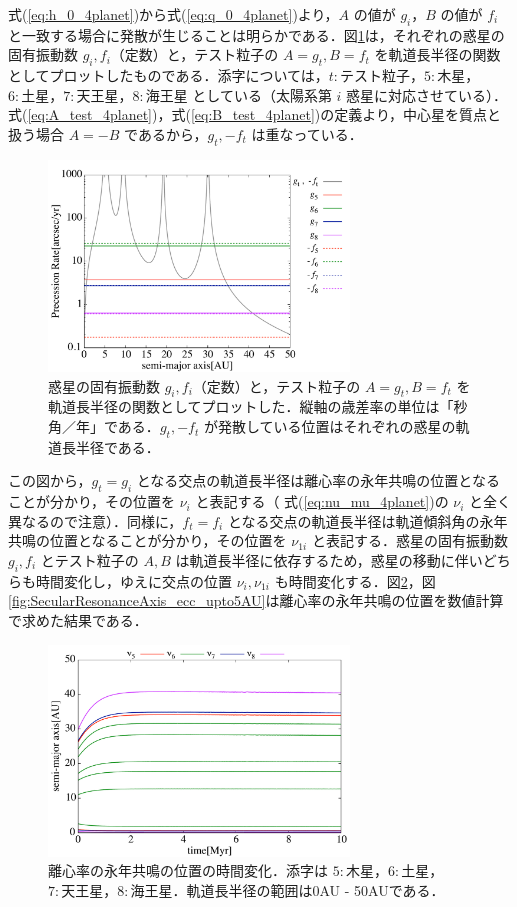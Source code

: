 \documentclass[11pt,a4paper,oneside,onecolumn]{jreport}
\begin{document}
式(\ref{eq:h_0_4planet})から式(\ref{eq:q_0_4planet})より，$A$ の値が $g_i$，$B$ の値が $f_i$ と一致する場合に発散が生じることは明らかである．図\ref{fig:PrecessionRate}は，それぞれの惑星の固有振動数 $g_i, f_i$（定数）と，テスト粒子の $A = g_t, B = f_t$ を軌道長半径の関数としてプロットしたものである．添字については，$t : テスト粒子$，$5 : 木星$，$6 : 土星$，$7 : 天王星$，$8 : 海王星$ としている（太陽系第 $i$ 惑星に対応させている）．式(\ref{eq:A_test_4planet})，式(\ref{eq:B_test_4planet})の定義より，中心星を質点と扱う場合 $A = - B$ であるから，$g_t, - f_t$ は重なっている．
\begin{figure}[H]
\centering
\includegraphics[width=8cm]{./image/PrecessionRate_logAB.pdf}
\caption{惑星の固有振動数 $g_i, f_i$（定数）と，テスト粒子の $A = g_t, B = f_t$ を軌道長半径の関数としてプロットした．縦軸の歳差率の単位は「秒角／年」である．$g_t, - f_t$ が発散している位置はそれぞれの惑星の軌道長半径である．\label{fig:PrecessionRate}}
\end{figure}
この図から，$g_t = g_i$ となる交点の軌道長半径は離心率の永年共鳴の位置となることが分かり，その位置を $\nu_i$ と表記する（ 式(\ref{eq:nu_mu_4planet})の $\nu_i$ と全く異なるので注意）．同様に，$f_t = f_i$ となる交点の軌道長半径は軌道傾斜角の永年共鳴の位置となることが分かり，その位置を $\nu_{1i}$ と表記する．惑星の固有振動数 $g_i, f_i$ とテスト粒子の $A, B$ は軌道長半径に依存するため，惑星の移動に伴いどちらも時間変化し，ゆえに交点の位置 $\nu_i, \nu_{1i}$ も時間変化する．図\ref{fig:SecularResonanceAxis_ecc}，図\ref{fig:SecularResonanceAxis_ecc_upto5AU}は離心率の永年共鳴の位置を数値計算で求めた結果である．
\begin{figure}[H]
\centering
\includegraphics[width=8cm]{./image/SecularResonanceAxis_ecc.pdf}
\caption{離心率の永年共鳴の位置の時間変化．添字は $5 : 木星$，$6 : 土星$，$7 : 天王星$，$8 : 海王星$．軌道長半径の範囲は0AU - 50AUである．\label{fig:SecularResonanceAxis_ecc}}
\end{figure}
\end{document}
